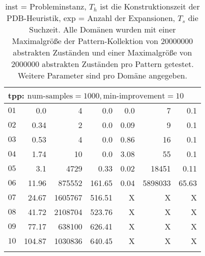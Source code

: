 \begin{longtable}{|c||r|r|r||r|r|r|}
\multicolumn{7}{|l|}{tpp: $\text{num-samples}=1000,\text{min-improvement}=10$}\\\hline
$01$ & 0.0 & 4 & 0.0 & 0.0 & 7 & 0.1 \\\hline
$02$ & 0.34 & 2 & 0.0 & 0.09 & 9 & 0.1 \\\hline
$03$ & 0.53 & 4 & 0.0 & 0.86 & 16 & 0.1 \\\hline
$04$ & 1.74 & 10 & 0.0 & 3.08 & 55 & 0.1 \\\hline
$05$ & 3.1 & 4729 & 0.33 & 0.02 & 18451 & 0.11 \\\hline
$06$ & 11.96 & 875552 & 161.65 & 0.04 & 5898033 & 65.63 \\\hline
$07$ & 24.67 & 1605767 & 516.51 & X & X & X \\\hline
$08$ & 41.72 & 2108704 & 523.76 & X & X & X \\\hline
$09$ & 77.17 & 638100 & 626.41 & X & X & X \\\hline
$10$ & 104.87 & 1030836 & 640.45 & X & X & X \\\hline

\caption{inst = Probleminstanz, $T_h$ ist die Konstruktionszeit der PDB-Heuristik, exp = Anzahl der Expansionen, $T_s$
die Suchzeit. Alle Domänen wurden mit einer Maximalgröße der Pattern-Kollektion von $20000000$ abstrakten Zuständen und 
einer Maximalgröße von $2000000$ abstrakten Zuständen pro Pattern getestet. Weitere Parameter sind pro Domäne angegeben.}
\end{longtable}